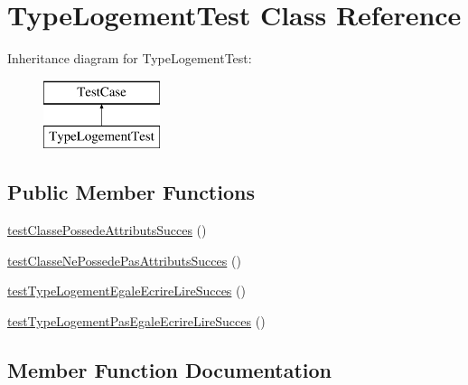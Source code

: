 \hypertarget{class_type_logement_test}{}\section{Type\+Logement\+Test Class Reference}
\label{class_type_logement_test}
Inheritance diagram for Type\+Logement\+Test\+:\begin{figure}[H]
\begin{center}
\leavevmode
\includegraphics[height=2.000000cm]{class_type_logement_test}
\end{center}
\end{figure}
\subsection*{Public Member Functions}
\begin{DoxyCompactItemize}
\item 
\hyperlink{class_type_logement_test_a4dbb3449bca654633ae52d71f1ce1090}{test\+Classe\+Possede\+Attributs\+Succes} ()
\item 
\hyperlink{class_type_logement_test_adbb82a5bd983444a23b9b79ed54d92a9}{test\+Classe\+Ne\+Possede\+Pas\+Attributs\+Succes} ()
\item 
\hyperlink{class_type_logement_test_ad22d04a8957563e4f9a2e1d51332ccf8}{test\+Type\+Logement\+Egale\+Ecrire\+Lire\+Succes} ()
\item 
\hyperlink{class_type_logement_test_ac46947bd67c1b48e45b74738fc5ddcc0}{test\+Type\+Logement\+Pas\+Egale\+Ecrire\+Lire\+Succes} ()
\end{DoxyCompactItemize}


\subsection{Member Function Documentation}
\mbox{\label{class_type_logement_test_adbb82a5bd983444a23b9b79ed54d92a9}} 
